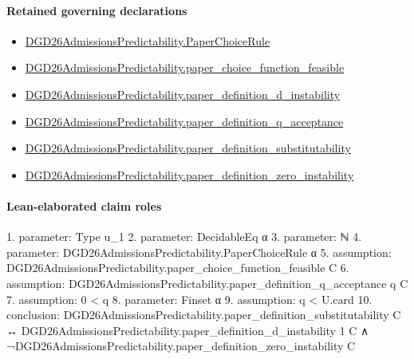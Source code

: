 \documentclass[10pt]{article}
\begin{document}
\paragraph{Retained governing declarations}
\begin{itemize}\raggedright
\item \hyperlink{governing-declaration-4678951b4432b184}{DGD26\allowbreak{}Admissions\allowbreak{}Predictability.\allowbreak{}Paper\allowbreak{}Choice\allowbreak{}Rule}
\item \hyperlink{governing-declaration-f7de74a44053f6d5}{DGD26\allowbreak{}Admissions\allowbreak{}Predictability.\allowbreak{}paper\_\allowbreak{}choice\_\allowbreak{}function\_\allowbreak{}feasible}
\item \hyperlink{governing-declaration-ce2c1c7a5233a84a}{DGD26\allowbreak{}Admissions\allowbreak{}Predictability.\allowbreak{}paper\_\allowbreak{}definition\_\allowbreak{}d\_\allowbreak{}instability}
\item \hyperlink{governing-declaration-7ecd62274fb2f391}{DGD26\allowbreak{}Admissions\allowbreak{}Predictability.\allowbreak{}paper\_\allowbreak{}definition\_\allowbreak{}q\_\allowbreak{}acceptance}
\item \hyperlink{governing-declaration-39cdd64a379d386b}{DGD26\allowbreak{}Admissions\allowbreak{}Predictability.\allowbreak{}paper\_\allowbreak{}definition\_\allowbreak{}substitutability}
\item \hyperlink{governing-declaration-c23ecf0aa84721c4}{DGD26\allowbreak{}Admissions\allowbreak{}Predictability.\allowbreak{}paper\_\allowbreak{}definition\_\allowbreak{}zero\_\allowbreak{}instability}
\end{itemize}
\paragraph{Lean-elaborated claim roles}\begin{ReviewVerbatim}
1. parameter: Type u_1
2. parameter: DecidableEq α
3. parameter: ℕ
4. parameter: DGD26AdmissionsPredictability.PaperChoiceRule α
5. assumption: DGD26AdmissionsPredictability.paper_choice_function_feasible C
6. assumption: DGD26AdmissionsPredictability.paper_definition_q_acceptance q C
7. assumption: 0 < q
8. parameter: Finset α
9. assumption: q < U.card
10. conclusion: DGD26AdmissionsPredictability.paper_definition_substitutability C ↔
  DGD26AdmissionsPredictability.paper_definition_d_instability 1 C ∧
    ¬DGD26AdmissionsPredictability.paper_definition_zero_instability C
\end{ReviewVerbatim}
\end{document}
